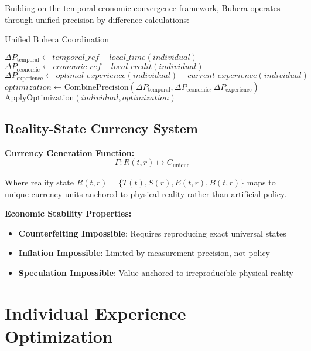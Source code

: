 \documentclass[12pt,a4paper]{article}
\begin{document}
Building on the temporal-economic convergence framework, Buhera operates through unified precision-by-difference calculations:

\begin{algorithm}
\caption{Unified Buhera Coordination}
\begin{algorithmic}[1]
        \State $\Delta P_{\text{temporal}} \leftarrow temporal\_ref - local\_time(individual)$
        \State $\Delta P_{\text{economic}} \leftarrow economic\_ref - local\_credit(individual)$
        \State $\Delta P_{\text{experience}} \leftarrow optimal\_experience(individual) - current\_experience(individual)$
        \State $optimization \leftarrow \text{CombinePrecision}(\Delta P_{\text{temporal}}, \Delta P_{\text{economic}}, \Delta P_{\text{experience}})$
        \State $\text{ApplyOptimization}(individual, optimization)$
    \EndFor
\EndProcedure
\end{algorithmic}
\end{algorithm}

\subsection{Reality-State Currency System}

\textbf{Currency Generation Function:}
\begin{equation}
\Gamma : R(t,r) \mapsto C_{\text{unique}}
\end{equation}

Where reality state $R(t,r) = \{T(t), S(r), E(t,r), B(t,r)\}$ maps to unique currency units anchored to physical reality rather than artificial policy.

\textbf{Economic Stability Properties:}
\begin{itemize}
\item \textbf{Counterfeiting Impossible}: Requires reproducing exact universal states
\item \textbf{Inflation Impossible}: Limited by measurement precision, not policy
\item \textbf{Speculation Impossible}: Value anchored to irreproducible physical reality
\end{itemize}

\section{Individual Experience Optimization}
\end{document}
